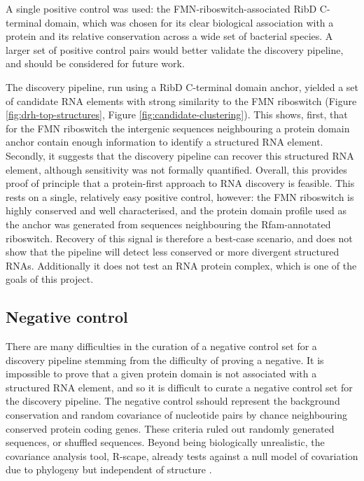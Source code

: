 A single positive control was used: the \ac{FMN}-riboswitch-associated RibD C-terminal domain, which was chosen for its clear biological association with a protein and its relative conservation across a wide set of bacterial species.
A larger set of positive control pairs would better validate the discovery pipeline, and should be considered for future work.

The discovery pipeline, run using a RibD C-terminal domain anchor, yielded a set of candidate RNA elements with strong similarity to the \ac{FMN} riboswitch (Figure \ref{fig:drh-top-structures}, Figure \ref{fig:candidate-clustering}).
This shows, first, that for the \ac{FMN} riboswitch the intergenic sequences neighbouring a protein domain anchor contain enough information to identify a structured RNA element.
Secondly, it suggests that the discovery pipeline can recover this structured RNA element, although sensitivity was not formally quantified.
Overall, this provides proof of principle that a protein-first approach to RNA discovery is feasible.
This rests on a single, relatively easy positive control, however: the \ac{FMN} riboswitch is highly conserved and well characterised, and the protein domain profile used as the anchor was generated from sequences neighbouring the Rfam-annotated riboswitch.
Recovery of this signal is therefore a best-case scenario, and does not show that the pipeline will detect less conserved or more divergent structured RNAs.
Additionally it does not test an RNA protein complex, which is one of the goals of this project.

\subsection{Negative control}

There are many difficulties in the curation of a negative control set for a discovery pipeline stemming from the difficulty of proving a negative.
It is impossible to prove that a given protein domain is not associated with a structured RNA element, and so it is difficult to curate a negative control set for the discovery pipeline.
The negative control sshould represent the background conservation and random covariance of nucleotide pairs by chance neighbouring conserved protein coding genes.
These criteria ruled out randomly generated sequences, or shuffled sequences.
Beyond being biologically unrealistic, the covariance analysis tool, R-scape, already tests against a null model of covariation due to phylogeny but independent of structure \citep{Rivas2017}.

